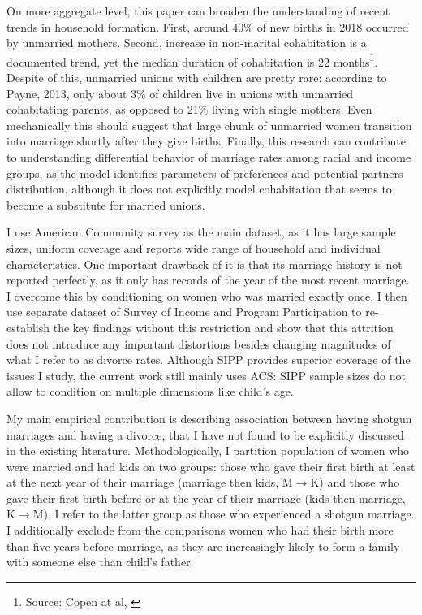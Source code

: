\documentclass[12pt,letter]{article}
\begin{document}
On more aggregate level, this paper can broaden the understanding of recent trends in household formation. First, around 40\% of new births in 2018 occurred by unmarried mothers. Second, increase in non-marital cohabitation is a documented trend, yet the median duration of cohabitation is 22 months\footnote{Source: Copen at al,  \cite{copen}}. Despite of this, unmarried unions with children are pretty rare: according to Payne, 2013\nocite{payne}, only about 3\% of children live in unions with unmarried cohabitating parents, as opposed to 21\% living with single mothers. Even mechanically this should suggest that large chunk of unmarried women transition into marriage shortly after they give births. Finally, this research can contribute to understanding differential behavior of marriage rates among racial and income groups, as the model identifies parameters of preferences and potential partners distribution, although it does not explicitly model cohabitation that seems to become a substitute for married unions.

I use American Community survey as the main dataset, as it has large sample sizes, uniform coverage and reports wide range of household and individual characteristics. One important drawback of it is that its marriage history is not reported perfectly, as it only has records of the year of the most recent marriage. I overcome this by conditioning on women who was married exactly once. I then use separate dataset of Survey of Income and Program Participation to re-establish the key findings without this restriction and show that this attrition does not introduce any important distortions besides changing magnitudes of what I refer to as divorce rates. Although SIPP provides superior coverage of the issues I study, the current work still mainly uses ACS: SIPP sample sizes do not allow to condition on multiple dimensions like child's age. 

My main empirical contribution is describing association between having shotgun marriages and having a divorce, that I have not found to be explicitly discussed in the existing literature. Methodologically, I partition population of women who were married and had kids on two groups:  those who gave their first birth at least at the next year of their marriage (marriage then kids, M$\to$K) and those who gave their first birth before or at the year of their marriage (kids then marriage, K$\to$M). I refer to the latter group as those who experienced a shotgun marriage. I additionally exclude from the comparisons women who had their birth more than five years before marriage, as they are increasingly likely to form a family with someone else than child's father. 
\end{document}

